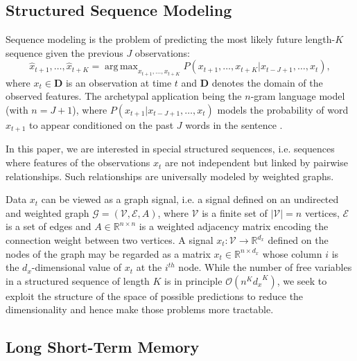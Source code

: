 \documentclass{article} %
\DeclareMathOperator*{\argmax}{arg\,max}
\newcommand{\R}{\mathbb{R}}
\newcommand{\bO}{\mathcal{O}}
\newcommand{\G}{\mathcal{G}}
\newcommand{\V}{\mathcal{V}}
\newcommand{\E}{\mathcal{E}}
\begin{document}

\subsection{Structured Sequence Modeling}

Sequence modeling is the problem of predicting the most likely future
length-$K$ sequence given the previous $J$ observations:
\begin{equation} \label{eqn:seq}
	\hat{x}_{t+1}, \ldots, \hat{x}_{t+K} =
	\argmax_{x_{t+1}, \ldots, x_{t+K}}
	P(x_{t+1}, \ldots, x_{t+K} | x_{t-J+1}, \ldots, x_t),
\end{equation}
where $x_t \in \mathbf{D}$ is an observation at time $t$ and $\mathbf{D}$
denotes the domain of the observed features. The archetypal application being
the $n$-gram language model (with $n = J+1$), where $P(x_{t+1} | x_{t-J+1},
\ldots, x_t)$ models the probability of word $x_{t+1}$ to appear conditioned on
the past $J$ words in the sentence \citep{seq_graves}.

In this paper, we are interested in special structured sequences, i.e. sequences where features of the observations $x_t$ are not independent but linked by pairwise relationships. Such relationships are universally modeled by weighted graphs. 

Data $x_t$ can be viewed as a graph signal, i.e.
a signal defined on an undirected and weighted graph $\G = (\V, \E, A)$, where
$\V$ is a finite set of $|\V| = n$ vertices, $\E$ is a set of edges and $A \in
\R^{n \times n}$ is a weighted adjacency matrix encoding the connection weight
between two vertices. A signal $x_t: \V \rightarrow \R^{d_x}$ defined on the
nodes of the graph may be regarded as a matrix $x_t \in \R^{n \times d_x}$
whose column $i$ is the $d_x$-dimensional value of $x_t$ at the $i^{th}$ node.
While the number of free variables in a structured sequence of length $K$ is in
principle $\bO(n^K {d_x}^K)$, we seek to exploit the structure of the space
of possible predictions to reduce the dimensionality and hence make those
problems more tractable.

\subsection{Long Short-Term Memory}
\end{document}
